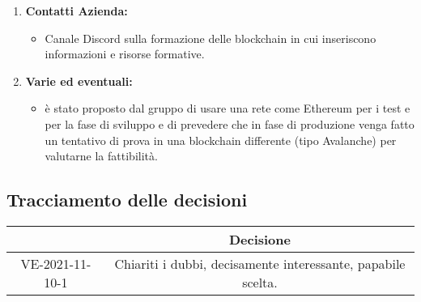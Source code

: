 \begin{enumerate}
	\item \textbf{Contatti Azienda:}
	\begin{itemize}
		\item Canale Discord\glo{} sulla formazione delle blockchain\glo{} in cui inseriscono informazioni e risorse formative.
	\end{itemize}

	\item \textbf{Varie ed eventuali:}
	\begin{itemize}
		\item è stato proposto dal gruppo di usare una rete come Ethereum\glo{} per i test e per la fase di sviluppo e di prevedere che in fase di produzione venga fatto un tentativo di prova in una blockchain\glo{} differente (tipo Avalanche) per valutarne la fattibilità.
	\end{itemize}

\end{enumerate}

\pagebreak

\subsection{Tracciamento delle decisioni}

\begin{table}[H]
	\centering
	\renewcommand{\arraystretch}{1.8}
	\begin{tabular}{c | c}
		\rowcolor[HTML]{125e28}
		\multicolumn{1}{c}{\color[HTML]{FFFFFF} \textbf{ID}} &
		\multicolumn{1}{c}{\color[HTML]{FFFFFF} \textbf{Decisione}} \\
		\hline
		VE-2021-11-10-1 & Chiariti i dubbi, decisamente interessante, papabile scelta. \\ \hline

	\end{tabular}
\end{table}